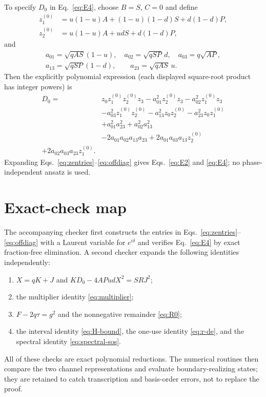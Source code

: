\documentclass[pra,aps,twocolumn,nofootinbib,superscriptaddress]{revtex4-2}
\begin{document}
To specify $D_0$ in Eq.~\eqref{eq:E4}, choose $B=S$, $C=0$ and define
\begin{align}
z_1^{(0)}&=u(1-u)A+(1-u)(1-d)S+d(1-d)P,\nonumber\\
z_2^{(0)}&=u(1-u)A+udS+d(1-d)P,
\end{align}
and
\begin{gather}
a_{01}=\sqrt{qAS}(1-u),\quad a_{02}=\sqrt{qSP}\,d,
\quad a_{03}=q\sqrt{AP},\nonumber\\
a_{13}=\sqrt{qSP}(1-d),\qquad a_{23}=\sqrt{qAS}\,u.
\end{gather}
Then the explicitly polynomial expression (each displayed square-root product
has integer powers) is
\begin{align}
D_0={}&z_0z_1^{(0)}z_2^{(0)}z_3-a_{01}^2z_2^{(0)}z_3
-a_{02}^2z_1^{(0)}z_3\nonumber\\
&-a_{03}^2z_1^{(0)}z_2^{(0)}-a_{13}^2z_0z_2^{(0)}
-a_{23}^2z_0z_1^{(0)}\nonumber\\
&+a_{01}^2a_{23}^2+a_{02}^2a_{13}^2\nonumber\\
&-2a_{01}a_{02}a_{13}a_{23}
+2a_{01}a_{03}a_{13}z_2^{(0)}\nonumber\\
+2a_{02}a_{03}a_{23}z_1^{(0)}.
\label{eq:D0}
\end{align}
Expanding Eqs.~\eqref{eq:zentries}--\eqref{eq:offdiag} gives
Eqs.~\eqref{eq:E2} and \eqref{eq:E4}; no phase-independent ansatz is used.

\section{Exact-check map}
\label{app:checks}

The accompanying checker first constructs the entries in
Eqs.~\eqref{eq:zentries}--\eqref{eq:offdiag} with a Laurent variable for
$e^{i\delta}$ and verifies Eq.~\eqref{eq:E4} by exact fraction-free
elimination.  A second checker expands the following identities independently:
\begin{enumerate}
\item $X=qK+J$ and $KD_0-4APudX^2=SRJ^2$;
\item the multiplier identity \eqref{eq:multiplier};
\item $F-2q\tau=g^2$ and the nonnegative remainder \eqref{eq:R0};
\item the interval identity \eqref{eq:H-bound}, the one-use identity
\eqref{eq:r-de}, and the spectral identity \eqref{eq:spectral-sos}.
\end{enumerate}
All of these checks are exact polynomial reductions.  The numerical routines
then compare the two channel representations and evaluate boundary-realizing
states; they are retained to catch transcription and basis-order errors, not
to replace the proof.


\end{document}
